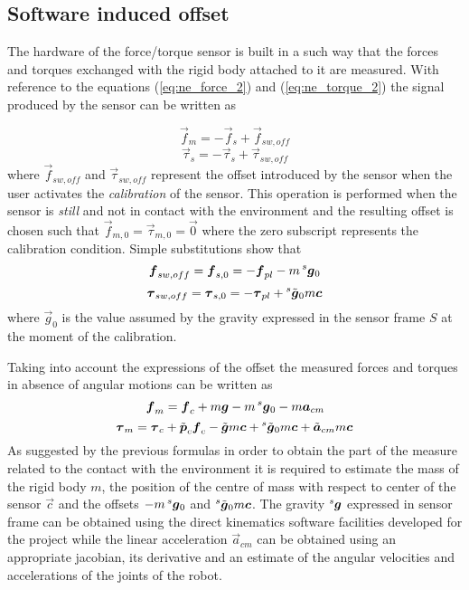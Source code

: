 \subsection{Software induced offset}
The hardware of the force/torque sensor is built in a such way that the forces and torques exchanged
with the rigid body attached to it are measured. With reference to the equations (\ref{eq:ne_force_2})
and (\ref{eq:ne_torque_2}) the signal produced by the sensor can be written as

\[
\vec{f}_{m} = -\vec{f}_{s} + \vec{f}_{sw,off}
\]
\[
\vec{\tau}_{s} = -\vec{\tau}_{s} + \vec{\tau}_{sw,off}
\]
where $\vec{f}_{sw, off}$ and $\vec{\tau}_{sw,off}$ represent the offset introduced by
the sensor when the user activates the \emph{calibration} of the sensor. This operation
is performed when the sensor is \emph{still} and not in contact with the environment
and the resulting offset is chosen such that $\vec{f}_{m,0} = \vec{\tau}_{m,0} = \vec{0}$
where the zero subscript represents the calibration condition. Simple substitutions show that
\[
\vec{f}_{sw,off} = \vec{f}_{s,0} = -\vec{f}_{pl} -m \prescript{s}{}{ \vec{g}}_{0}
\]
\[
\vec{\tau}_{sw,off} = \vec{\tau}_{s,0} = -\vec{\tau}_{pl} + \prescript{s}{}{ \tilde{\vec{g}}}_{0} m\vec{c}
\]
where $\vec{g}_{0}$ is the value assumed by the gravity expressed in the sensor frame $S$ at the
moment of the calibration.
\par
Taking into account the expressions of the offset the measured forces and torques in absence of angular
motions can be written as
\begin{equation}
  \label{eq:m_force_2}
  \vec{f}_{m} = \vec{f}_{c} +m \vec{g} -m \prescript{s}{}{ \vec{g}}_{0} - m  \vec{a}_{cm}
\end{equation}
\begin{equation}
  \label{eq:m_torque_2}
  \vec{\tau}_{m} = \vec{\tau}_{c} + \tilde{\vec{p}}_{c}  \vec{f}_{c}
  - \tilde{\vec{g}} m\vec{c} + \prescript{s}{}{ \tilde{\vec{g}}}_{0} m\vec{c} +  \tilde{\vec{a}}_{cm} m  \vec{c}
\end{equation}
As suggested by the previous formulas in order to obtain the part of the measure related to the contact
with the environment it is required to estimate the mass of the rigid body $m$, the position of the centre of
mass with respect to center of the sensor $\vec{c}$ and the offsets $-m \prescript{s}{}{ \vec{g}}_{0}$
and $\prescript{s}{}{ \tilde{\vec{g}}}_{0} m\vec{c}$.
The gravity $\prescript{s}{}{ \vec{g}}$ expressed in sensor frame can be obtained using the direct kinematics software facilities
developed for the project while the linear acceleration $\vec{a}_{cm}$ can be obtained using an appropriate
jacobian, its derivative and an estimate of the angular velocities and accelerations of the joints
of the robot.

